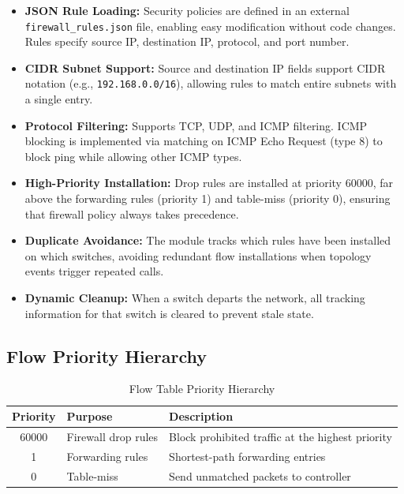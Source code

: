 \documentclass[12pt,a4paper]{article}
\begin{document}
\begin{itemize}[leftmargin=1.5cm]
    \item \textbf{JSON Rule Loading:} Security policies are defined in an external \texttt{firewall\_rules.json} file, enabling easy modification without code changes. Rules specify source IP, destination IP, protocol, and port number.
    \item \textbf{CIDR Subnet Support:} Source and destination IP fields support CIDR notation (e.g., \texttt{192.168.0.0/16}), allowing rules to match entire subnets with a single entry.
    \item \textbf{Protocol Filtering:} Supports TCP, UDP, and ICMP filtering. ICMP blocking is implemented via matching on ICMP Echo Request (type 8) to block ping while allowing other ICMP types.
    \item \textbf{High-Priority Installation:} Drop rules are installed at priority 60000, far above the forwarding rules (priority 1) and table-miss (priority 0), ensuring that firewall policy always takes precedence.
    \item \textbf{Duplicate Avoidance:} The module tracks which rules have been installed on which switches, avoiding redundant flow installations when topology events trigger repeated calls.
    \item \textbf{Dynamic Cleanup:} When a switch departs the network, all tracking information for that switch is cleared to prevent stale state.
\end{itemize}

\subsection{Flow Priority Hierarchy}

\begin{table}[H]
\centering
\begin{tabular}{@{}clp{7cm}@{}}
\toprule
\textbf{Priority} & \textbf{Purpose} & \textbf{Description} \\
\midrule
60000 & Firewall drop rules & Block prohibited traffic at the highest priority \\
1 & Forwarding rules & Shortest-path forwarding entries \\
0 & Table-miss & Send unmatched packets to controller \\
\bottomrule
\end{tabular}
\caption{Flow Table Priority Hierarchy}
\end{table}
\end{document}
